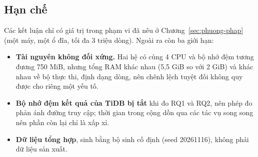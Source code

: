 \subsection*{Hạn chế}
Các kết luận chỉ có giá trị trong phạm vi đã nêu ở Chương~\ref{sec:phuong-phap} (một máy, một ổ đĩa, tối đa 3 triệu dòng). Ngoài ra còn ba giới hạn:
\begin{itemize}
  \item \textbf{Tài nguyên không đối xứng.} Hai hệ có cùng 4 CPU và bộ nhớ đệm tương đương 750 MiB, nhưng tổng RAM khác nhau (5,5 GiB so với 2 GiB) và khác nhau về bộ thực thi, định dạng dòng, nên chênh lệch tuyệt đối không quy được cho riêng một yếu tố.
  \item \textbf{Bộ nhớ đệm kết quả của TiDB bị tắt} khi đo RQ1 và RQ2, nên phép đo phản ánh đường truy cập; thời gian trong  cộng dồn qua các tác vụ song song nên phần còn lại  chỉ là xấp xỉ.
  \item \textbf{Dữ liệu tổng hợp}, sinh bằng bộ sinh cố định (seed 20261116), không phải dữ liệu sản xuất.
\end{itemize}
